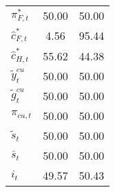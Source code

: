 \begin{center}
\begin{longtable}{lcc}
${\pi_{F,t}^*}        $	 & 	             50.00	 & 	             50.00 \\ 
${\hat c_{F,t}^*}     $	 & 	              4.56	 & 	             95.44 \\ 
${\hat c_{H,t}^*}     $	 & 	             55.62	 & 	             44.38 \\ 
${\tilde y_t^{cu}}    $	 & 	             50.00	 & 	             50.00 \\ 
${\tilde g_t^{cu}}    $	 & 	             50.00	 & 	             50.00 \\ 
${\pi_{cu,t}}         $	 & 	             50.00	 & 	             50.00 \\ 
${\tilde s_t}         $	 & 	             50.00	 & 	             50.00 \\ 
${\bar s_t}           $	 & 	             50.00	 & 	             50.00 \\ 
${i_t}                $	 & 	             49.57	 & 	             50.43 \\ 
\end{longtable}
 \end{center}

